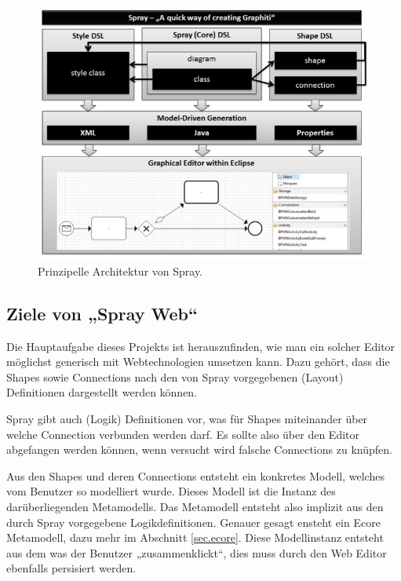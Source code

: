 \begin{figure}[h!]
  \centering
  \includegraphics[width=1.0\textwidth]{Figures/SprayArchitektur.png}
  \caption{Prinzipelle Architektur von Spray. \citep[aus][S.~3]{sprayPaper}}\label{fig.sprayArchi}
\end{figure}


\subsection{Ziele von „Spray Web“}

Die Hauptaufgabe dieses Projekts ist herauszufinden, wie man ein solcher Editor
möglichst generisch mit Webtechnologien umsetzen kann.
Dazu gehört, dass die Shapes sowie Connections nach den von Spray
vorgegebenen (Layout) Definitionen dargestellt werden können.

Spray gibt auch (Logik) Definitionen vor,
was für Shapes miteinander über welche Connection verbunden werden darf.
Es sollte also über den Editor abgefangen werden können, wenn versucht wird
falsche Connections zu knüpfen.

Aus den Shapes und deren Connections entsteht ein konkretes Modell,
welches vom Benutzer so modelliert wurde. Dieses Modell ist die Instanz
des darüberliegenden Metamodells.
Das Metamodell entsteht also implizit aus den durch Spray vorgegebene
Logikdefinitionen. Genauer gesagt ensteht ein Ecore Metamodell,
dazu mehr im Abschnitt \ref{sec.ecore}.
Diese Modellinstanz entsteht aus dem was der Benutzer „zusammenklickt“,
dies muss durch den Web Editor ebenfalls persisiert werden.

